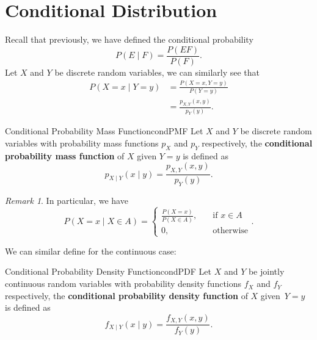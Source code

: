 \documentclass[math]{amznotes}
\theoremstyle{remark}
\newtheorem*{remark}{Remark}
\newcommand{\0}{\mathbf{0}}
\newcommand{\1}{\mathbf{1}}
\begin{document}
\section{Conditional Distribution}
Recall that previously, we have defined the conditional probability
\begin{equation*}
    P(E \mid F) = \frac{P(EF)}{P(F)}.
\end{equation*}
Let $X$ and $Y$ be discrete random variables, we can similarly see that
\begin{align*}
    P(X = x \mid Y = y) & = \frac{P(X = x, Y = y)}{P(Y = y)} \\
    & = \frac{p_{X, Y}(x, y)}{p_Y(y)}.
\end{align*}
\begin{dfnbox}{Conditional Probability Mass Function}{condPMF}
    Let $X$ and $Y$ be discrete random variables with probability mass functions $p_X$ and $p_Y$ respectively, the {\color{red} \textbf{conditional probability mass function}} of $X$ given $Y = y$ is defined as
    \begin{equation*}
        p_{X \mid Y}(x \mid y) = \frac{p_{X, Y}(x, y)}{p_Y(y)}.
    \end{equation*}
\end{dfnbox}
\begin{notebox}
    \begin{remark}
        In particular, we have
        \begin{equation*}
            P(X = x \mid X \in A) = \begin{cases}
                \frac{P(X = x)}{P(X \in A)}, & \quad\textrm{if } x \in A \\
                0, & \quad\textrm{otherwise}
            \end{cases}.
        \end{equation*}
    \end{remark}
\end{notebox}
We can similar define for the continuous case:
\begin{dfnbox}{Conditional Probability Density Function}{condPDF}
    Let $X$ and $Y$ be jointly continuous random variables with probability density functions $f_X$ and $f_Y$ respectively, the {\color{red} \textbf{conditional probability density function}} of $X$ given~$Y = y$ is defined as
    \begin{equation*}
        f_{X \mid Y}(x \mid y) = \frac{f_{X, Y}(x, y)}{f_Y(y)}.
    \end{equation*}
\end{dfnbox}
\end{document}
